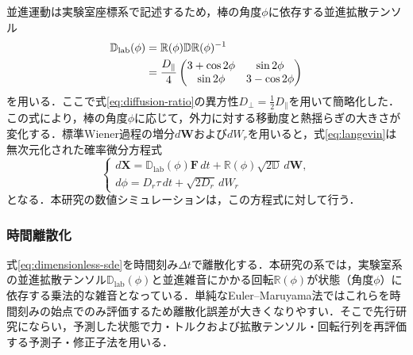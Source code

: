 \documentclass[dvipdfmx]{ampbt}
\begin{document}
  並進運動は実験室座標系で記述するため，棒の角度$\phi$に依存する並進拡散テンソル
  \begin{align}
    \mathbb{D}_{\mathrm{lab}}(\phi)
     & =
    \mathbb{R}(\phi)\mathbb{D}\mathbb{R}(\phi)^{-1} \notag \\
     & =
    \frac{D_{\parallel}}{4}
    \begin{pmatrix}
      3+\cos 2\phi & \sin 2\phi   \\
      \sin 2\phi   & 3-\cos 2\phi
    \end{pmatrix}
    \label{eq:diffusion-lab}
  \end{align}
  を用いる．ここで式\eqref{eq:diffusion-ratio}の異方性$D_{\perp}=\frac12 D_{\parallel}$を用いて簡略化した．この式により，棒の角度$\phi$に応じて，外力に対する移動度と熱揺らぎの大きさが変化する．標準Wiener過程の増分$d\bm{W}$および$dW_r$を用いると，式\eqref{eq:langevin}は無次元化された確率微分方程式
  \begin{equation}
    \begin{cases}
      d\bm{X}
      =
      \mathbb{D}_{\mathrm{lab}}(\phi)\bm{F}\,dt
      +\mathbb{R}(\phi)\sqrt{2\mathbb{D}}\,d\bm{W}, \\[4pt]
      d\phi
      =
      D_r\tau\,dt+\sqrt{2D_r}\,dW_r
    \end{cases}
    \label{eq:dimensionless-sde}
  \end{equation}
  となる．本研究の数値シミュレーションは，この方程式に対して行う．

  \subsubsection{時間離散化}
  式\eqref{eq:dimensionless-sde}を時間刻み$\Delta t$で離散化する．本研究の系では，実験室系の並進拡散テンソル$\mathbb{D}_{\mathrm{lab}}(\phi)$と並進雑音にかかる回転$\mathbb{R}(\phi)$が状態（角度$\phi$）に依存する乗法的な雑音となっている．単純なEuler--Maruyama法ではこれらを時間刻みの始点でのみ評価するため離散化誤差が大きくなりやすい．そこで先行研究\cite{yang2019}にならい，予測した状態で力・トルクおよび拡散テンソル・回転行列を再評価する予測子・修正子法を用いる．
\end{document}
